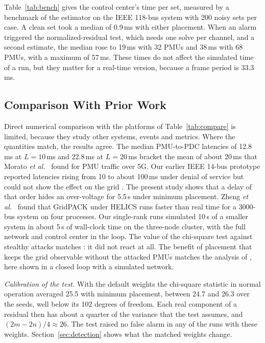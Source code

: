 \documentclass[journal]{IEEEtran}
\begin{document}
Table~\ref{tab:bench} gives the control center's time per set, measured by a benchmark of the estimator on the IEEE 118-bus system with 200 noisy sets per case. A clean set took a median of 0.9\,ms with either placement. When an alarm triggered the normalized-residual test, which needs one solve per channel, and a second estimate, the median rose to 19\,ms with 32 PMUs and 38\,ms with 68 PMUs, with a maximum of 57\,ms. These times do not affect the simulated time of a run, but they matter for a real-time version, because a frame period is 33.3\,ms.

\subsection{Comparison With Prior Work}

Direct numerical comparison with the platforms of Table~\ref{tab:compare} is limited, because they study other systems, events and metrics. Where the quantities match, the results agree. The median PMU-to-PDC latencies of 12.8\,ms at $L = 10$\,ms and 22.8\,ms at $L = 20$\,ms bracket the mean of about 20\,ms that Morato \emph{et al.}~\cite{morato2024fiveg} found for PMU traffic over 5G. Our earlier IEEE 14-bus prototype reported latencies rising from 10 to about 100\,ms under denial of service but could not show the effect on the grid \cite{islam2024remotely}. The present study shows that a delay of that order hides an over-voltage for 5.5\,s under minimum placement. Zheng \emph{et al.}~\cite{zheng2024hpc} found that GridPACK under HELICS runs faster than real time for a 3000-bus system on four processes. Our single-rank runs simulated 10\,s of a smaller system in about 5\,s of wall-clock time on the three-node cluster, with the full network and control center in the loop. The value of the chi-square test against stealthy attacks matches \cite{liu2009fdi,yang2024tensor}: it did not react at all. The benefit of placement that keeps the grid observable without the attacked PMUs matches the analysis of \cite{khalafi2022intrusion}, here shown in a closed loop with a simulated network.

\emph{Calibration of the test.} With the default weights the chi-square statistic in normal operation averaged 25.5 with minimum placement, between 24.7 and 26.3 over the seeds, well below its 102 degrees of freedom. Each real component of a residual then has about a quarter of the variance that the test assumes, and $(2m - 2n)/4 \approx 26$. The test raised no false alarm in any of the runs with these weights. Section~\ref{sec:detection} shows what the matched weights change.
\end{document}
